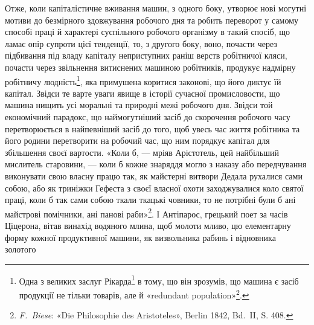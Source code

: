 Отже, коли капіталістичне вживання машин, з одного боку,
утворює нові могутні мотиви до безмірного здовжування робочого
дня та робить переворот у самому способі праці й характері суспільного
робочого організму в такий спосіб, що ламає опір супроти
цієї тенденції, то, з другого боку, воно, почасти через підбивання
під владу капіталу неприступних раніш верств робітничої кляси,
почасти через звільнення витиснених машиною робітників, продукує
надмірну робітничу людність\footnote{
Одна з великих заслуг Рікарда\footnote*{
У французькому виданні тут сказано: «Одна з заслуг Сісмонді
та Рікарда в тому, що вони зрозуміли і~». \emph{Ред.}
} в тому, що він зрозумів, що
машина є засіб продукції не тільки товарів, але й «redundant
population»\footnote*{
надмірної людности. \emph{Ред.}
}.
}, яка примушена коритися
законові, що його диктує їй капітал. Звідси те варте уваги явище в
історії сучасної промисловости, що машина нищить усі моральні та
природні межі робочого дня. Звідси той економічний парадокс, що
наймогутніший засіб до скорочення робочого часу перетворюється
в найпевніший засіб до того, щоб увесь час життя робітника та
його родини перетворити на робочий час, що ним порядкує капітал
для збільшення своєї вартости. «Коли б, — мріяв Арістотель,
цей найбільший мислитель старовини, — коли б кожне знаряддя
могло з наказу або передчування виконувати свою власну працю
так, як майстерні витвори Дедала рухалися сами собою, або як
триніжки Гефеста з своєї власної охоти заходжувалися коло святої
праці, коли б так сами собою ткали ткацькі човники, то не потрібні
були б ані майстрові помічники, ані панові раби»\footnote{
\emph{F.~Biese}: «Die Philosophie des Aristoteles», Berlin 1842, Bd.~II,
S. 408.
}. І Антіпарос,
грецький поет за часів Ціцерона, вітав винахід водяного
млина, щоб молоти мливо, цю елементарну форму кожної
продуктивної машини, як визвольника рабинь і відновника золотого
